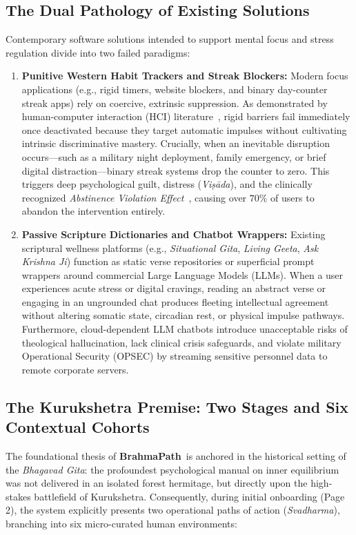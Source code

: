 \documentclass[11pt,a4paper]{article}
\newcommand{\AppName}{\textbf{BrahmaPath}}
\begin{document}
\subsection{The Dual Pathology of Existing Solutions}
Contemporary software solutions intended to support mental focus and stress regulation divide into two failed paradigms:
\begin{enumerate}[leftmargin=*]
    \item \textbf{Punitive Western Habit Trackers and Streak Blockers:} Modern focus applications (e.g., rigid timers, website blockers, and binary day-counter streak apps) rely on coercive, extrinsic suppression. As demonstrated by human-computer interaction (HCI) literature~\cite{lyngs2019selfcontrol}, rigid barriers fail immediately once deactivated because they target automatic impulses without cultivating intrinsic discriminative mastery. Crucially, when an inevitable disruption occurs---such as a military night deployment, family emergency, or brief digital distraction---binary streak systems drop the counter to zero. This triggers deep psychological guilt, distress (\textit{Vi\d{s}\=ada}), and the clinically recognized \textit{Abstinence Violation Effect}~\cite{lyngs2019selfcontrol}, causing over $70\%$ of users to abandon the intervention entirely.
    \item \textbf{Passive Scripture Dictionaries and Chatbot Wrappers:} Existing scriptural wellness platforms (e.g., \textit{Situational Gita}, \textit{Living Geeta}, \textit{Ask Krishna Ji}) function as static verse repositories or superficial prompt wrappers around commercial Large Language Models (LLMs). When a user experiences acute stress or digital cravings, reading an abstract verse or engaging in an ungrounded chat produces fleeting intellectual agreement without altering somatic state, circadian rest, or physical impulse pathways. Furthermore, cloud-dependent LLM chatbots introduce unacceptable risks of theological hallucination, lack clinical crisis safeguards, and violate military Operational Security (OPSEC) by streaming sensitive personnel data to remote corporate servers.
\end{enumerate}

\subsection{The Kurukshetra Premise: Two Stages and Six Contextual Cohorts}
The foundational thesis of \AppName\ is anchored in the historical setting of the \textit{Bhagavad Gita}: the profoundest psychological manual on inner equilibrium was not delivered in an isolated forest hermitage, but directly upon the high-stakes battlefield of Kurukshetra. Consequently, during initial onboarding (Page 2), the system explicitly presents two operational paths of action (\textit{Svadharma}), branching into six micro-curated human environments:
\end{document}
